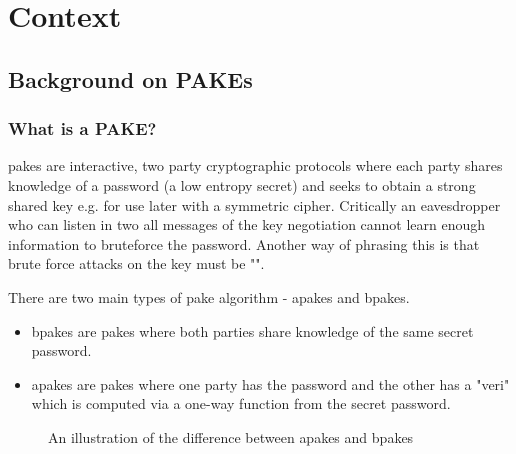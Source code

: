 \chapter{Context}
\section{Background on PAKEs}
\subsection{What is a PAKE?}
\glspl{pake} are interactive, two party cryptographic protocols where each party shares knowledge of a password (a low entropy secret) and seeks to obtain a strong shared key e.g. for use later with a symmetric cipher. Critically an eavesdropper who can listen in two all messages of the key negotiation cannot learn enough information to bruteforce the password. Another way of phrasing this is that brute force attacks on the key must be "".

\medskip
There are two main types of \gls{pake} algorithm - \glspl{apake} and \glspl{bpake}.
\begin{itemize}
  \item \glspl{bpake} are \glspl{pake} where both parties share knowledge of the same secret password.
  \item \glspl{apake} are \glspl{pake} where one party has the password and the other has a "\gls{veri}" which is computed via a one-way function from the secret password.
\end{itemize}

\begin{figure}[H]
  \centering

  \caption{An illustration of the difference between \glspl{apake} and \glspl{bpake}}
  \label{fig:pake_compare}
\end{figure}

